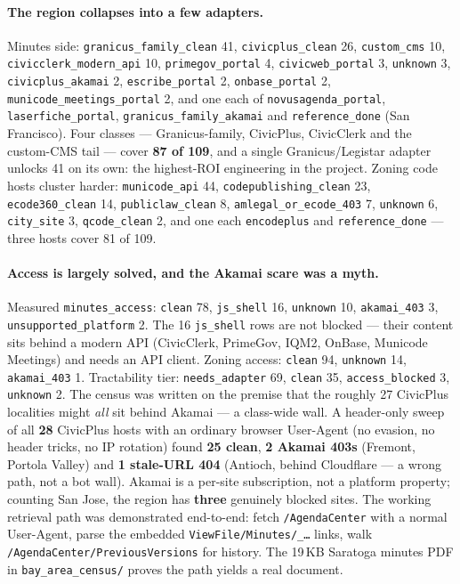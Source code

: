 \documentclass[11pt]{article}
\begin{document}
\paragraph{The region collapses into a few adapters.} Minutes side:
\texttt{granicus\_family\_clean} 41, \texttt{civicplus\_clean} 26, \texttt{custom\_cms} 10,
\texttt{civicclerk\_modern\_api} 10, \texttt{primegov\_portal} 4, \texttt{civicweb\_portal} 3,
\texttt{unknown} 3, \texttt{civicplus\_akamai} 2, \texttt{escribe\_portal} 2,
\texttt{onbase\_portal} 2, \texttt{municode\_meetings\_portal} 2, and one each of
\texttt{novusagenda\_portal}, \texttt{laserfiche\_portal}, \texttt{granicus\_family\_akamai} and
\texttt{reference\_done} (San Francisco). Four classes --- Granicus-family, CivicPlus, CivicClerk
and the custom-CMS tail --- cover \textbf{87 of 109}, and a single Granicus/Legistar adapter
unlocks 41 on its own: the highest-ROI engineering in the project. Zoning code hosts cluster
harder: \texttt{municode\_api} 44, \texttt{codepublishing\_clean} 23, \texttt{ecode360\_clean}
14, \texttt{publiclaw\_clean} 8, \texttt{amlegal\_or\_ecode\_403} 7, \texttt{unknown} 6,
\texttt{city\_site} 3, \texttt{qcode\_clean} 2, and one each \texttt{encodeplus} and
\texttt{reference\_done} --- three hosts cover 81 of 109.

\paragraph{Access is largely solved, and the Akamai scare was a myth.} Measured
\texttt{minutes\_access}: \texttt{clean} 78, \texttt{js\_shell} 16, \texttt{unknown} 10,
\texttt{akamai\_403} 3, \texttt{unsupported\_platform} 2. The 16 \texttt{js\_shell} rows are not
blocked --- their content sits behind a modern API (CivicClerk, PrimeGov, IQM2, OnBase, Municode
Meetings) and needs an API client. Zoning access: \texttt{clean} 94, \texttt{unknown} 14,
\texttt{akamai\_403} 1. Tractability tier: \texttt{needs\_adapter} 69, \texttt{clean} 35,
\texttt{access\_blocked} 3, \texttt{unknown} 2. The census was written on the premise that the
roughly 27 CivicPlus localities might \emph{all} sit behind Akamai --- a class-wide wall. A
header-only sweep of all \textbf{28} CivicPlus hosts with an ordinary browser User-Agent (no
evasion, no header tricks, no IP rotation) found \textbf{25 clean}, \textbf{2 Akamai 403s}
(Fremont, Portola Valley) and \textbf{1 stale-URL 404} (Antioch, behind Cloudflare --- a wrong
path, not a bot wall). Akamai is a per-site subscription, not a platform property; counting San
Jose, the region has \textbf{three} genuinely blocked sites. The working retrieval path was
demonstrated end-to-end: fetch \texttt{/AgendaCenter} with a normal User-Agent, parse the
embedded \texttt{ViewFile/Minutes/\_\dots} links, walk \texttt{/AgendaCenter/PreviousVersions}
for history. The 19\,KB Saratoga minutes PDF in \texttt{bay\_area\_census/} proves the path
yields a real document.
\end{document}
